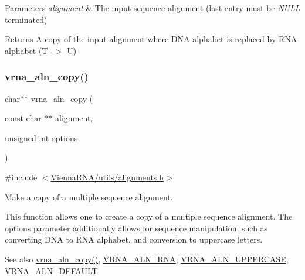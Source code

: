 \begin{DoxyParams}{Parameters}
{\em alignment} & The input sequence alignment (last entry must be {\itshape N\+U\+LL} terminated) \\
\hline
\end{DoxyParams}
\begin{DoxyReturn}{Returns}
A copy of the input alignment where D\+NA alphabet is replaced by R\+NA alphabet (T -\/$>$ U) 
\end{DoxyReturn}
\mbox{\label{group__aln__utils_ga08cdca592461436860daf9738279ce17}} 
\subsubsection{\texorpdfstring{vrna\+\_\+aln\+\_\+copy()}{vrna\_aln\_copy()}}
{\footnotesize\ttfamily char$\ast$$\ast$ vrna\+\_\+aln\+\_\+copy (\begin{DoxyParamCaption}\item[{const char $\ast$$\ast$}]{alignment,  }\item[{unsigned int}]{options }\end{DoxyParamCaption})}



{\ttfamily \#include $<$\hyperlink{utils_2alignments_8h}{Vienna\+R\+N\+A/utils/alignments.\+h}$>$}



Make a copy of a multiple sequence alignment. 

This function allows one to create a copy of a multiple sequence alignment. The {\ttfamily options} parameter additionally allows for sequence manipulation, such as converting D\+NA to R\+NA alphabet, and conversion to uppercase letters.

\begin{DoxySeeAlso}{See also}
\hyperlink{group__aln__utils_ga08cdca592461436860daf9738279ce17}{vrna\+\_\+aln\+\_\+copy()}, \hyperlink{group__aln__utils_ga1a2aa60bcc51dc8e48c07bf146bd28c1}{V\+R\+N\+A\+\_\+\+A\+L\+N\+\_\+\+R\+NA}, \hyperlink{group__aln__utils_ga0de72fc917d72acafe862750a3a5e0bc}{V\+R\+N\+A\+\_\+\+A\+L\+N\+\_\+\+U\+P\+P\+E\+R\+C\+A\+SE}, \hyperlink{group__aln__utils_ga7437bcbc3142b266f1f3b086eb669092}{V\+R\+N\+A\+\_\+\+A\+L\+N\+\_\+\+D\+E\+F\+A\+U\+LT}
\end{DoxySeeAlso}

